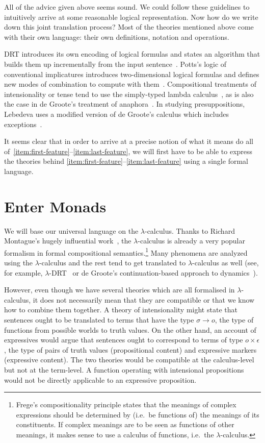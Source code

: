All of the advice given above seems sound. We could follow these guidelines
to intuitively arrive at some reasonable logical representation. Now how do
we write down this joint translation process? Most of the theories
mentioned above come with their own language: their own definitions,
notation and operations.

DRT introduces its own encoding of logical formulas and states an algorithm
that builds them up incrementally from the input
sentence~\cite{kamp1993discourse}. Potts's logic of conventional
implicatures introduces two-dimensional logical formulas and defines new
modes of combination to compute with
them~\cite{potts2005logic}. Compositional treatments of intensionality or
tense tend to use the simply-typed lambda
calculus~\cite{ben2007semantics,de2013note}, as is also the case in de
Groote's treatment of anaphora~\cite{de2006towards}. In studying
presuppositions, Lebedeva uses a modified version of de Groote's calculus
which includes exceptions~\cite{lebedeva2012expression}.

It seems clear that in order to arrive at a precise notion of what it means
do all of~\ref{item:first-feature}--\ref{item:last-feature}, we will first
have to be able to express the theories behind
\ref{item:first-feature}--\ref{item:last-feature} using a single formal
language.

\section*{Enter Monads}

We will base our universal language on the $\lambda$-calculus. Thanks to
Richard Montague's hugely influential work~\cite{montague1973proper}, the
$\lambda$-calculus is already a very popular formalism in formal
compositional semantics.\footnote{Frege's compositionality principle states
  that the meanings of complex expressions should be determined by (i.e.\
  be functions of) the meanings of its constituents. If complex meanings
  are to be seen as functions of other meanings, it makes sense to use a
  calculus of functions, i.e.\ the $\lambda$-calculus.} Many phenomena are
analyzed using the $\lambda$-calculus and the rest tend to get translated
to $\lambda$-calculus as well (see, for example,
$\lambda$-DRT~\cite{kuschert1995type} or de Groote's continuation-based
approach to dynamics~\cite{de2006towards}).

However, even though we have several theories which are all formalised in
$\lambda$-calculus, it does not necessarily mean that they are compatible
or that we know how to combine them together. A theory of intensionality
might state that sentences ought to be translated to terms that have the
type $\sigma \to o$, the type of functions from possible worlds to truth
values. On the other hand, an account of expressives would argue that
sentences ought to correspond to terms of type $o \times \epsilon$, the
type of pairs of truth values (propositional content) and expressive
markers (expressive content). The two theories would be compatible at the
calculus-level but not at the term-level. A function operating with
intensional propositions would not be directly applicable to an expressive
proposition.

